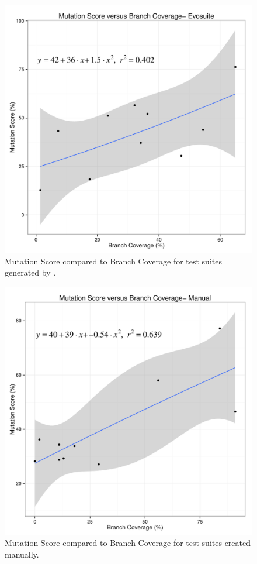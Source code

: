 \begin{figure}[!t]
\centering
  \includegraphics[width=\linewidth]{RGraphs/Evosuite_BranchCov_versus_Mutation_poly.pdf}
    \caption{Mutation Score compared to Branch Coverage for test suites generated by \evo.}
  \label{fig:Evo_branch_mutation}
\end{figure}
\begin{figure}[!t]
\centering
  \includegraphics[width=\linewidth]{RGraphs/Manual_BranchCov_versus_Mutation_poly.pdf}
    \caption{Mutation Score compared to Branch Coverage for test suites created manually.}
  \label{fig:manual_branch_mutation}
\end{figure}

